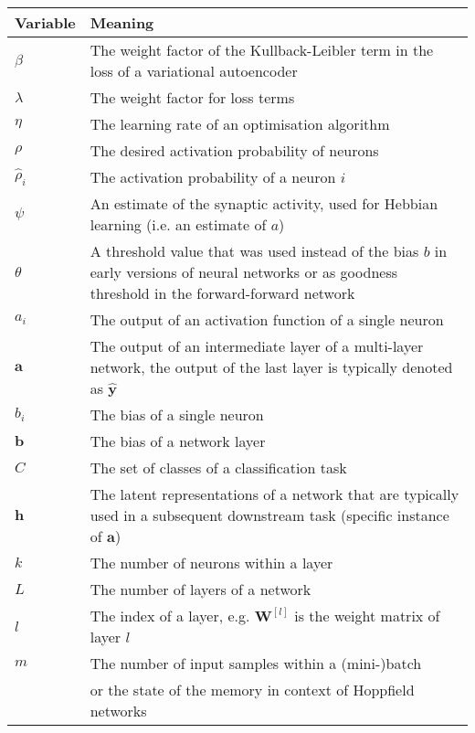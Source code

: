 \begin{tabular}{ p{3cm} p{11cm} }
	\textbf{Variable} & \textbf{Meaning}\\
	\hline
	$\beta$ & The weight factor of the Kullback-Leibler term in the loss of a variational autoencoder\\
	$\lambda$ & The weight factor for loss terms\\
	$\eta$ & The learning rate of an optimisation algorithm\\
	$\rho$ & The desired activation probability of neurons\\
	$\hat{\rho}_i$ & The activation probability of a neuron $i$\\
	$\psi$ & An estimate of the synaptic activity, used for Hebbian learning (i.e. an estimate of $a$)\\
	$\theta$ & A threshold value that was used instead of the bias $b$ in early versions of neural networks or as goodness threshold in the forward-forward network\\
	$a_i$ & The output of an activation function of a single neuron\\
	$\boldsymbol{a}$ & The output of an intermediate layer of a multi-layer network, the output of the last layer is typically denoted as $\boldsymbol{\hat{y}}$\\
	$b_i$ & The bias of a single neuron\\
	$\boldsymbol{b}$ & The bias of a network layer\\
	$C$ & The set of classes of a classification task\\
	$\boldsymbol{h}$ & The latent representations of a network that are typically used in a subsequent downstream task (specific instance of $\boldsymbol{a}$)\\
	$k$ & The number of neurons within a layer\\
	$L$ & The number of layers of a network\\
	$l$ & The index of a layer, e.g. $\boldsymbol{W}^{[l]}$ is the weight matrix of layer $l$\\
	$m$ & The number of input samples within a (mini-)batch\\
	    & or the state of the memory in context of Hoppfield networks\\
\end{tabular}


